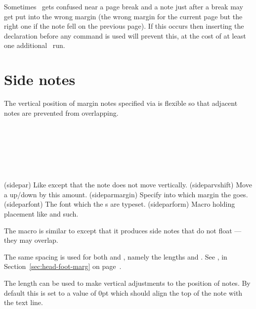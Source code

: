      Sometimes \ltx\ gets confused near a page break and a note just after
a break may get put into the wrong margin 
(the wrong margin for the current 
page but the right one if the note fell on the previous page). If this occurs
then inserting the \cmd{\strictpagecheck} declaration before 
any \cmd{\marginpar}
command is used will prevent this, at the cost of at least one additional
\ltx\ run.


\section{Side notes}

    The vertical position of margin notes 
specified via \cmd{\marginpar}
is flexible so that adjacent notes are prevented from overlapping.

\begin{syntax}
\cmd{\sidepar} \\
\cmd{\sideparmargin}\\
\cmd{\sideparfont}\\
\cmd{\sideparform}\\
\lnc{\sideparvshift} \\
\end{syntax}
\glossary(sidepar)%
  {}%
  {Like  except that the note does not move vertically.}
\glossary(sideparvshift)%
  {}%
  {Move a  up/down by this amount.}
\glossary(sideparmargin)%
{}%
{Specify into which margin the  goes.}
\glossary(sideparfont)%
{}%
{The font which the s are typeset.}
\glossary(sideparform)
{}%
{Macro holding placement like  and such.}

    The \cmd{\sidepar} macro is similar to \cmd{\marginpar} except that
it produces side notes that do not float --- 
they may overlap. 

The same spacing is used for both \cmd{\marginpar} and \cmd{\sidepar},
namely the lengths \lnc{\marginparsep} and \lnc{\marginparwidth}. See
\cmd{\setmarginnotes}, in Section~\ref{sec:head-foot-marg} on
page~\pageref{sec:head-foot-marg}.

The length
\lnc{\sideparvshift} can be used to make vertical 
adjustments to the
position of \cmd{\sidepar} notes. By default this is set to a value
of 0pt which should align the top of the note with the text line.

